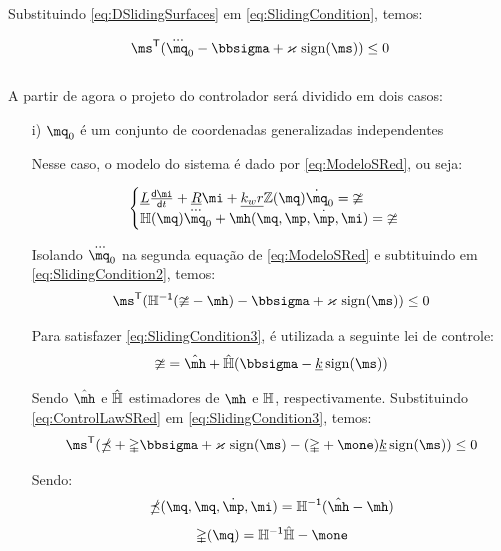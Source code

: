 \documentclass[a4paper,11pt,brazil,fleqn]{article}
\begin{document}
Substituindo \eqref{eq:DSlidingSurfaces} em \eqref{eq:SlidingCondition}, temos:

\begin{equation} \label{eq:SlidingCondition2}
\ms^\msT (\dddot{\mq}_0 -\msigma + \varkappa \, \sign(\ms) ) \leq 0
\end{equation} \\

A partir de agora o projeto do controlador ser\'a dividido em dois casos:

\begin{itemize}
\item[i)] $\mq_0$ \'e um conjunto de coordenadas generalizadas independentes

Nesse caso, o modelo do sistema \'e dado por \eqref{eq:ModeloSRed}, ou seja:

$$
\begin{cases}
\underline{L} \frac{\dd \mi}{\dd t} + \underline{R} \mi + \underline{k_w r} \mZ (\mq) \dot{\mq}_0= \mup
\\
\mH(\mq) \dddot{\mq}_0 + \mh(\mq,\mp,\dot{\mp}, \mi) = \mup
\end{cases}
$$

Isolando $\dddot{\mq}_0$ na segunda equa\c{c}\~ao de \eqref{eq:ModeloSRed} e subtituindo em \eqref{eq:SlidingCondition2}, temos:
\begin{equation} \label{eq:SlidingCondition3}
\ms^\msT (\mH^\msI (\mup - \mh ) -\msigma + \varkappa \, \sign(\ms) ) \leq 0
\end{equation}

Para satisfazer \eqref{eq:SlidingCondition3}, \'e utilizada a seguinte lei de controle:
\begin{equation} \label{eq:ControlLawSRed}
\mup = \hat{\mh} + \hat{\mH}( \msigma - \underline{k} \sign(\ms) )
\end{equation}

Sendo $\hat{\mh}$ e $\hat{\mathbb{H}}$ estimadores de $\mh$ e $\mathbb{H}$, respectivamente. Substituindo \eqref{eq:ControlLawSRed} em \eqref{eq:SlidingCondition3}, temos:
\begin{equation} \label{eq:SlidingCondition4}
\ms^\msT (\mdelta + \mDelta \msigma  + \varkappa \, \sign(\ms) - (\mDelta + \mone) \underline{k} \sign(\ms) ) \leq 0
\end{equation}

Sendo:
\begin{equation}
\mdelta(\mq,\mq,\dot{\mp},\mi) = \mH^\msI (\hat{\mh} - \mh)
\end{equation}
\begin{equation}
\mDelta(\mq) = \mH^\msI \hat{\mH} - \mone
\end{equation}


\end{itemize}
\end{document}
